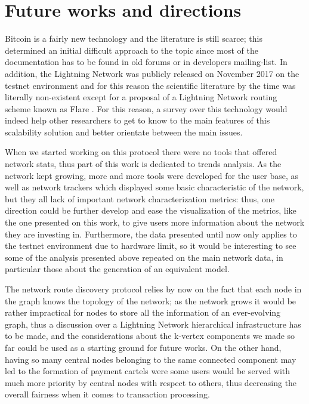 	\section{Future works and directions}
	
	Bitcoin is a fairly new technology and the literature is still scarce; this determined an initial difficult approach to the topic since most of the documentation has to be found in old forums or in developers mailing-list. In addition, the Lightning Network was publicly released on November 2017 on the testnet environment and for this reason the scientific literature by the time was literally non-existent except for a proposal of a Lightning Network routing scheme known as Flare \cite{Prihodko2016}. For this reason, a survey over this technology would indeed help other researchers to get to know to the main features of this scalability solution and better orientate between the main issues.
	
	When we started working on this protocol there were no tools that offered network stats, thus part of this work is dedicated to trends analysis. As the network kept growing, more and more tools were developed for the user base, as well as network trackers which displayed some basic characteristic of the network, but they all lack of important network characterization metrics: thus, one direction could be further develop and ease the visualization of the metrics, like the one presented on this work, to give users more information about the network they are investing in. Furthermore, the data presented until now only applies to the testnet environment due to hardware limit, so it would be interesting to see some of the analysis presented above repeated on the main network data, in particular those about the generation of an equivalent model.
	
	The network route discovery protocol relies by now on the fact that each node in the graph knows the topology of the network; as the network grows it would be rather impractical for nodes to store all the information of an ever-evolving graph, thus a discussion over a Lightning Network hierarchical infrastructure has to be made, and the considerations about the k-vertex components we made so far could be used as a starting ground for future works. On the other hand, having so many central nodes belonging to the same connected component may led to the formation of payment cartels were some users would be served with much more priority by central nodes with respect to others, thus decreasing the overall fairness when it comes to transaction processing.
	
